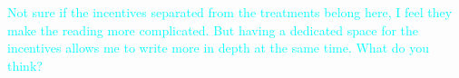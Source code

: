 \documentclass[11pt,a4paper,oneside]{article}
\begin{document}
\textcolor{cyan}{Not sure if the incentives separated from the treatments belong here, I feel they make the reading more complicated. But having a dedicated space for the incentives allows me to write more in depth at the same time. What do you think?}








\end{document}
